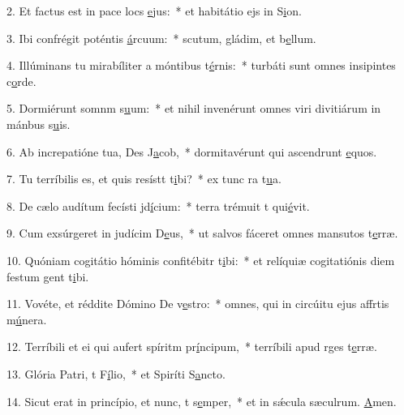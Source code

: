 2. Et factus est in pace locs \uline{e}jus:~* et habitátio ejs in S\uline{i}on.\par 
3. Ibi confrégit poténtis \uline{á}rcuum:~* scutum, gládim, et b\uline{e}llum.\par 
4. Illúminans tu mirabíliter a móntibus t\uline{é}rnis:~* turbáti sunt omnes insipintes c\uline{o}rde.\par 
5. Dormiérunt somnm s\uline{u}um:~* et nihil invenérunt omnes viri divitiárum in mánbus s\uline{u}is.\par 
6. Ab increpatióne tua, Des J\uline{a}cob,~* dormitavérunt qui ascendrunt \uline{e}quos.\par 
7. Tu terríbilis es, et quis resístt t\uline{i}bi?~* ex tunc ra t\uline{u}a.\par 
8. De cælo audítum fecísti jd\uline{í}cium:~* terra trémuit t qui\uline{é}vit.\par 
9. Cum exsúrgeret in judícim D\uline{e}us,~* ut salvos fáceret omnes mansutos t\uline{e}rræ.\par 
10. Quóniam cogitátio hóminis confitébitr t\uline{i}bi:~* et relíquiæ cogitatiónis diem festum gent t\uline{i}bi.\par 
11. Vovéte, et réddite Dómino De v\uline{e}stro:~* omnes, qui in circúitu ejus affrtis m\uline{ú}nera.\par 
12. Terríbili et ei qui aufert spíritm pr\uline{í}ncipum,~* terríbili apud rges t\uline{e}rræ.\par 
13. Glória Patri, t F\uline{í}lio,~* et Spiríti S\uline{a}ncto.\par 
14. Sicut erat in princípio, et nunc, t s\uline{e}mper,~* et in sǽcula sæculrum. \uline{A}men.\par 
